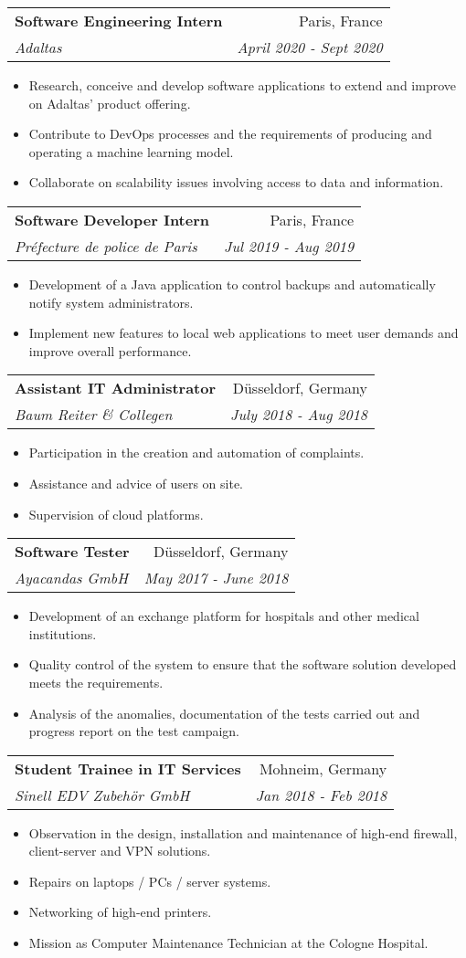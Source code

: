 \documentclass[a4paper,11pt]{article}
\makeatletter
\newcommand{\resumeItem}[2]{
  \item\small{
    \textbf{#1}{ #2 \vspace{-2pt}}
  }
}
\newcommand{\resumeSubheading}[4]{
  \vspace{-1pt}\item
    \begin{tabular*}{0.97\textwidth}{l@{\extracolsep{\fill}}r}
      \textbf{#1} & #2 \\
      \textit{\small#3} & \textit{\small #4} \\
    \end{tabular*}\vspace{-5pt}
}
\newcommand{\resumeItemListStart}{\begin{itemize}}
\newcommand{\resumeItemListEnd}{\end{itemize}\vspace{-5pt}}
\makeatother
\begin{document}
    \resumeSubheading
      {Software Engineering Intern}{Paris, France}
      {Adaltas}{April 2020 - Sept 2020}
      \resumeItemListStart
        \resumeItem{}
          {Research, conceive and develop software applications to extend and improve on Adaltas' product offering.}
        \resumeItem{}
          {Contribute to DevOps processes and the requirements of producing and operating a machine learning model.}
        \resumeItem{}
          {Collaborate on scalability issues involving access to data and information.}
      \resumeItemListEnd
  
    \resumeSubheading
      {Software Developer Intern}{Paris, France}
      {Préfecture de police de Paris}{Jul 2019 - Aug 2019}
      \resumeItemListStart
        \resumeItem{}
          {Development of a Java application to control backups and automatically notify system administrators.}
        \resumeItem{}
          {Implement new features to local web applications to meet user demands and improve overall performance.}
      \resumeItemListEnd

    \resumeSubheading
      {Assistant IT Administrator}{Düsseldorf, Germany}
      {Baum Reiter \& Collegen}{July 2018 - Aug 2018}
      \resumeItemListStart
        \resumeItem{}
          {Participation in the creation and automation of complaints.}
        \resumeItem{}
          {Assistance and advice of users on site.}
        \resumeItem{}
          {Supervision of cloud platforms.}
      \resumeItemListEnd

    \resumeSubheading
      {Software Tester}{Düsseldorf, Germany}
      {Ayacandas GmbH}{May 2017 - June 2018}
      \resumeItemListStart
        \resumeItem{}
          {Development of an exchange platform for hospitals and other medical institutions.}
        \resumeItem{}
          {Quality control of the system to ensure that the software solution developed meets the requirements.}
        \resumeItem{}
          {Analysis of the anomalies, documentation of the tests carried out and progress report on the test campaign.}
      \resumeItemListEnd

      \resumeSubheading
      {Student Trainee in IT Services}{Mohneim, Germany}
      {Sinell EDV Zubehör GmbH}{Jan 2018 - Feb 2018}
      \resumeItemListStart
        \resumeItem{}
          {Observation in the design, installation and maintenance of high-end firewall, client-server and VPN solutions.}
        \resumeItem{}
          {Repairs on laptops / PCs / server systems.}
        \resumeItem{}
          {Networking of high-end printers.}
        \resumeItem{}
          {Mission as Computer Maintenance Technician at the Cologne Hospital.}
      \resumeItemListEnd
      
\end{document}
